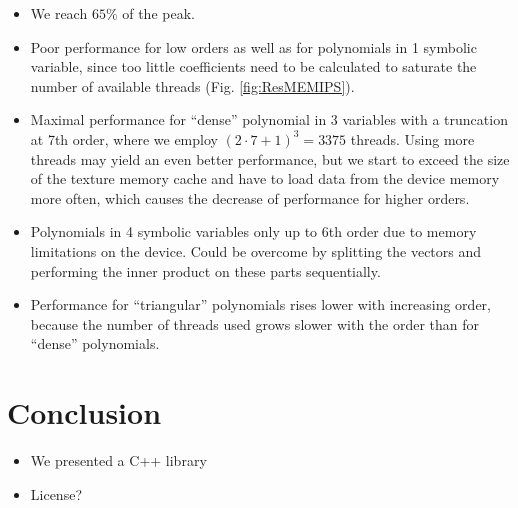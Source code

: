 \documentclass[oribibl]{llncs2e/llncs}
\begin{document}
\begin{itemize}
\item We reach $65\%$ of the peak.
\item Poor performance for low orders as well as for polynomials in 1 symbolic variable, since too little coefficients need to be calculated to saturate the number of available threads (Fig. \ref{fig:ResMEMIPS}).
\item Maximal performance for ``dense'' polynomial in 3 variables with a truncation at 7th order, where we employ $(2\cdot7+1)^3 = 3375$ threads. Using more threads may yield an even better performance, but we start to exceed the size of the texture memory cache and have to load data from the device memory more often, which causes the decrease of performance for higher orders.
\item Polynomials in 4 symbolic variables only up to 6th order due to memory limitations on the device. Could be overcome by splitting the vectors and performing the inner product on these parts sequentially.
\item Performance for ``triangular'' polynomials rises lower with increasing order, because the number of threads used grows slower with the order than for ``dense'' polynomials.
\end{itemize}


\section{Conclusion}
\begin{itemize}
\item We presented a C++ library
\item License?
\end{itemize}



\end{document}
